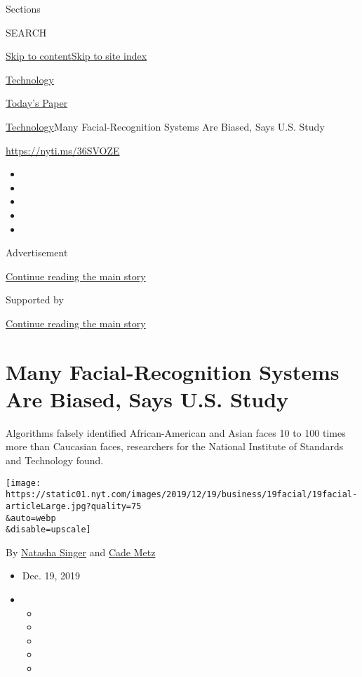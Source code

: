 Sections

SEARCH

\protect\hyperlink{site-content}{Skip to
content}\protect\hyperlink{site-index}{Skip to site index}

\href{https://www.nytimes.com/section/technology}{Technology}

\href{https://myaccount.nytimes.com/auth/login?response_type=cookie\&client_id=vi}{}

\href{https://www.nytimes.com/section/todayspaper}{Today's Paper}

\href{/section/technology}{Technology}\textbar{}Many Facial-Recognition
Systems Are Biased, Says U.S. Study

\url{https://nyti.ms/36SVOZE}

\begin{itemize}
\item
\item
\item
\item
\item
\end{itemize}

Advertisement

\protect\hyperlink{after-top}{Continue reading the main story}

Supported by

\protect\hyperlink{after-sponsor}{Continue reading the main story}

\hypertarget{many-facial-recognition-systems-are-biased-says-us-study}{%
\section{Many Facial-Recognition Systems Are Biased, Says U.S.
Study}\label{many-facial-recognition-systems-are-biased-says-us-study}}

Algorithms falsely identified African-American and Asian faces 10 to 100
times more than Caucasian faces, researchers for the National Institute
of Standards and Technology found.

\texttt{[image: https://static01.nyt.com/images/2019/12/19/business/19facial/19facial-articleLarge.jpg?quality=75\\\&auto=webp\\\&disable=upscale]}

By \href{https://www.nytimes.com/by/natasha-singer}{Natasha Singer} and
\href{https://www.nytimes.com/by/cade-metz}{Cade Metz}

\begin{itemize}
\item
  Dec. 19, 2019
\item
  \begin{itemize}
  \item
  \item
  \item
  \item
  \item
  \end{itemize}
\end{itemize}

